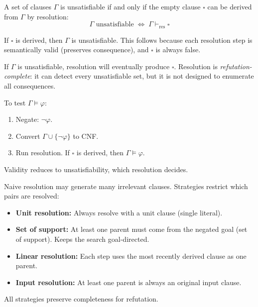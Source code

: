 \begin{tcolorbox}[colback=thmbox, colframe=thmborder, arc=2pt,
  left=6pt, right=6pt, top=4pt, bottom=4pt,
  title={\small\textbf{Theorem (Soundness and Completeness of Resolution)}},
  fonttitle=\small\bfseries]
\label{thm:res-sound}\label{thm:res-complete}
A set of clauses $\Gamma$ is unsatisfiable if and only if the empty clause
$\square$ can be derived from $\Gamma$ by resolution:
\[
\Gamma \text{ unsatisfiable} \;\Longleftrightarrow\; \Gamma \vdash_{\mathrm{res}} \square
\]
\end{tcolorbox}

\begin{remark}
If $\square$ is derived, then $\Gamma$ is unsatisfiable. This follows because
each resolution step is semantically valid (preserves consequence), and
$\square$ is always false.
\end{remark}

\begin{remark}
If $\Gamma$ is unsatisfiable, resolution will eventually produce $\square$.
Resolution is \emph{refutation-complete}: it can detect every unsatisfiable
set, but it is not designed to enumerate all consequences.
\end{remark}

\begin{remark}\label{rem:res-validity}
To test $\Gamma \models \varphi$:
\begin{enumerate}
  \item Negate: $\neg\varphi$.
  \item Convert $\Gamma \cup \{\neg\varphi\}$ to CNF.
  \item Run resolution. If $\square$ is derived, then $\Gamma \models \varphi$.
\end{enumerate}
Validity reduces to unsatisfiability, which resolution decides.
\end{remark}

\begin{remark}\label{rem:res-strat}
Naive resolution may generate many irrelevant clauses. Strategies restrict
which pairs are resolved:
\begin{itemize}
  \item \textbf{Unit resolution:} Always resolve with a unit clause (single literal).
  \item \textbf{Set of support:} At least one parent must come from the
        negated goal (set of support). Keeps the search goal-directed.
  \item \textbf{Linear resolution:} Each step uses the most recently derived
        clause as one parent.
  \item \textbf{Input resolution:} At least one parent is always an original
        input clause.
\end{itemize}
All strategies preserve completeness for refutation.
\end{remark}
